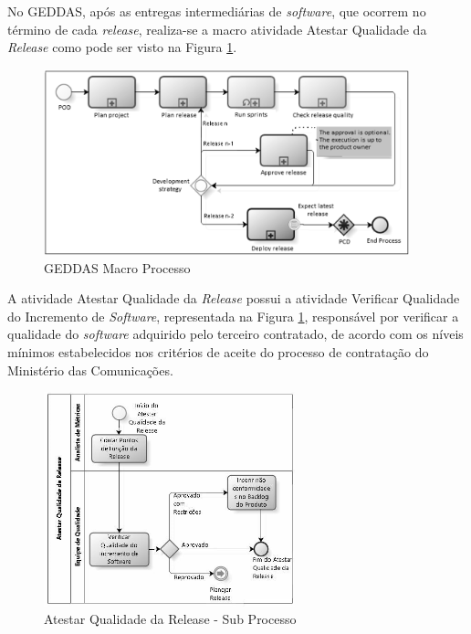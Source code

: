 No GEDDAS, após as entregas intermediárias de \textit{software}, que ocorrem no término de
cada \textit{release}, realiza-se a macro atividade Atestar Qualidade da \textit{Release} como pode
ser visto na Figura \ref{fig:geddas}.

\begin{figure}[h]
  \centering
  \includegraphics[width=400px, scale=1]{figuras/geddas}
  \caption{GEDDAS Macro Processo}
  \label{fig:geddas}
\end{figure}

A atividade Atestar Qualidade da \textit{Release} possui a atividade Verificar Qualidade
do Incremento de \textit{Software},  representada na Figura \ref{fig:geddas}, responsável por verificar a
qualidade do \textit{software} adquirido pelo terceiro contratado, de acordo com os níveis
mínimos estabelecidos nos critérios de aceite do processo de contratação do
Ministério das Comunicações.

\begin{figure}[h]
  \centering
  \includegraphics[width=275px, scale=1]{figuras/atestarqualidade}
  \caption{Atestar Qualidade da Release - Sub Processo}
  \label{fig:atestarqualidade}
\end{figure}
